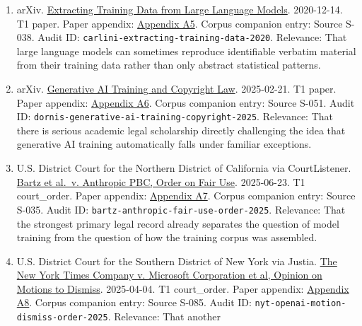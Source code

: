 \documentclass[
  american,
  11pt,
  letterpaper,
]{article}
\begin{document}
\begin{enumerate}
{  A4}. Corpus companion entry: Source S-125. Audit ID:
  \texttt{usco-ai-noi-2023}. Relevance: That by August 2023 the U.S.
  Copyright Office had already elevated AI training inputs and
  disclosure questions into a formal federal inquiry.
\item
  arXiv. \href{https://arxiv.org/abs/2012.07805}{Extracting Training
  Data from Large Language Models}. 2020-12-14. T1 paper. Paper
  appendix:
  \hyperref[ch-04-appendix-a5-extracting-training-data-from-large-language-models]{Appendix
  A5}. Corpus companion entry: Source S-038. Audit ID:
  \texttt{carlini-extracting-training-data-2020}. Relevance: That large
  language models can sometimes reproduce identifiable verbatim material
  from their training data rather than only abstract statistical
  patterns.
\item
  arXiv. \href{https://arxiv.org/abs/2502.15858}{Generative AI Training
  and Copyright Law}. 2025-02-21. T1 paper. Paper appendix:
  \hyperref[ch-04-appendix-a6-generative-ai-training-and-copyright-law]{Appendix
  A6}. Corpus companion entry: Source S-051. Audit ID:
  \texttt{dornis-generative-ai-training-copyright-2025}. Relevance: That
  there is serious academic legal scholarship directly challenging the
  idea that generative AI training automatically falls under familiar
  exceptions.
\item
  U.S. District Court for the Northern District of California via
  CourtListener.
  \href{https://storage.courtlistener.com/recap/gov.uscourts.cand.434709/gov.uscourts.cand.434709.231.0_3.pdf}{Bartz
  et al.~v. Anthropic PBC, Order on Fair Use}. 2025-06-23. T1
  court\_order. Paper appendix:
  \hyperref[ch-04-appendix-a7-bartz-et-al-v-anthropic-pbc-order-on-fair-use]{Appendix
  A7}. Corpus companion entry: Source S-035. Audit ID:
  \texttt{bartz-anthropic-fair-use-order-2025}. Relevance: That the
  strongest primary legal record already separates the question of model
  training from the question of how the training corpus was assembled.
\item
  U.S. District Court for the Southern District of New York via Justia.
  \href{https://cases.justia.com/federal/district-courts/new-york/nysdce/1\%3A2023cv11195/612697/514/0.pdf?ts=1743868265}{The
  New York Times Company v. Microsoft Corporation et al, Opinion on
  Motions to Dismiss}. 2025-04-04. T1 court\_order. Paper appendix:
  \hyperref[ch-04-appendix-a8-the-new-york-times-company-v-microsoft-corporation-et-al-opinion-on-motions-to-dismiss]{Appendix
  A8}. Corpus companion entry: Source S-085. Audit ID:
  \texttt{nyt-openai-motion-dismiss-order-2025}. Relevance: That another

\end{enumerate}
\end{document}
